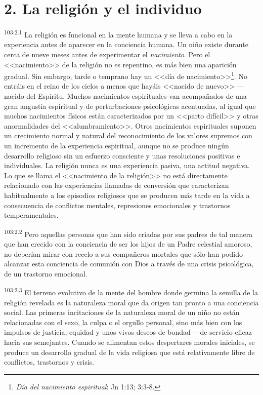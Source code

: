 \section*{2. La religión y el individuo}
\par
\textsuperscript{103:2.1} La religión es funcional en la mente humana y se lleva a cabo en la experiencia antes de aparecer en la conciencia humana. Un niño existe durante cerca de nueve meses antes de experimentar el \textit{nacimiento}. Pero el <<nacimiento>> de la religión no es repentino, es más bien una aparición gradual. Sin embargo, tarde o temprano hay un <<día de nacimiento>>\footnote{\textit{Día del nacimiento espiritual}: Jn 1:13; 3:3-8.}. No entráis en el reino de los cielos a menos que hayáis <<nacido de nuevo>> ---nacido del Espíritu. Muchos nacimientos espirituales van acompañados de una gran angustia espiritual y de perturbaciones psicológicas acentuadas, al igual que muchos nacimientos físicos están caracterizados por un <<parto difícil>> y otras anormalidades del <<alumbramiento>>. Otros nacimientos espirituales suponen un crecimiento normal y natural del reconocimiento de los valores supremos con un incremento de la experiencia espiritual, aunque no se produce ningún desarrollo religioso sin un esfuerzo consciente y unas resoluciones positivas e individuales. La religión nunca es una experiencia pasiva, una actitud negativa. Lo que se llama el <<nacimiento de la religión>> no está directamente relacionado con las experiencias llamadas de conversión que caracterizan habitualmente a los episodios religiosos que se producen más tarde en la vida a consecuencia de conflictos mentales, represiones emocionales y trastornos temperamentales.

\par
\textsuperscript{103:2.2} Pero aquellas personas que han sido criadas por sus padres de tal manera que han crecido con la conciencia de ser los hijos de un Padre celestial amoroso, no deberían mirar con recelo a sus compañeros mortales que sólo han podido alcanzar esta conciencia de comunión con Dios a través de una crisis psicológica, de un trastorno emocional.

\par
\textsuperscript{103:2.3} El terreno evolutivo de la mente del hombre donde germina la semilla de la religión revelada es la naturaleza moral que da origen tan pronto a una conciencia social. Las primeras incitaciones de la naturaleza moral de un niño no están relacionadas con el sexo, la culpa o el orgullo personal, sino más bien con los impulsos de justicia, equidad y unos vivos deseos de bondad ---de servicio eficaz hacia sus semejantes. Cuando se alimentan estos despertares morales iniciales, se produce un desarrollo gradual de la vida religiosa que está relativamente libre de conflictos, trastornos y crisis.

